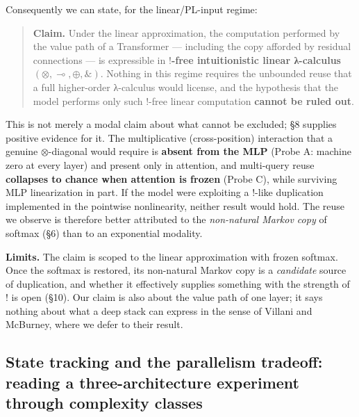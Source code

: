 \documentclass[a4paper,11pt]{article}
\begin{document}
Consequently we can state, for the linear/PL-input regime:

\begin{quote}
\textbf{Claim.} Under the linear approximation, the computation
performed by the value path of a Transformer --- including the copy
afforded by residual connections --- is expressible in
\textbf{\(!\)-free intuitionistic linear λ-calculus}
\((\otimes,\multimap,\oplus,\&)\). Nothing in this regime requires the
unbounded reuse that a full higher-order λ-calculus would license, and
the hypothesis that the model performs only such \(!\)-free linear
computation \textbf{cannot be ruled out}.
\end{quote}

This is not merely a modal claim about what cannot be excluded; §8
supplies positive evidence for it. The multiplicative (cross-position)
interaction that a genuine \(\otimes\)-diagonal would require is
\textbf{absent from the MLP} (Probe A: machine zero at every layer) and
present only in attention, and multi-query reuse \textbf{collapses to
chance when attention is frozen} (Probe C), while surviving MLP
linearization in part. If the model were exploiting a \(!\)-like
duplication implemented in the pointwise nonlinearity, neither result
would hold. The reuse we observe is therefore better attributed to the
\emph{non-natural Markov copy} of softmax (§6) than to an exponential
modality.

\textbf{Limits.} The claim is scoped to the linear approximation with
frozen softmax. Once the softmax is restored, its non-natural Markov
copy is a \emph{candidate} source of duplication, and whether it
effectively supplies something with the strength of \(!\) is open (§10).
Our claim is also about the value path of one layer; it says nothing
about what a deep stack can express in the sense of Villani and
McBurney, where we defer to their result.

\hypertarget{state-tracking-and-the-parallelism-tradeoff-reading-a-three-architecture-experiment-through-complexity-classes}{%
\subsection{State tracking and the parallelism tradeoff: reading a three-architecture experiment through complexity classes}\label{state-tracking-and-the-parallelism-tradeoff-reading-a-three-architecture-experiment-through-complexity-classes}}
\end{document}
